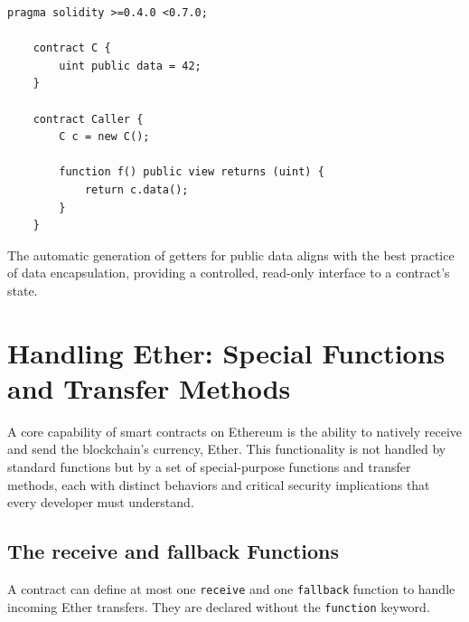 \documentclass{scrbook}
\begin{document}
\newpage

\begin{lstlisting}[caption={Automatic getter generation}, label={lbl:automatic_getter}]
    pragma solidity >=0.4.0 <0.7.0;
    
    contract C {
        uint public data = 42;
    }
    
    contract Caller {
        C c = new C();
        
        function f() public view returns (uint) {
            return c.data();
        }
    }
\end{lstlisting}

The automatic generation of getters for public data aligns with the best practice of data encapsulation, providing a controlled, read-only interface to a contract's state.

\chapter{Handling Ether: Special Functions and Transfer Methods}

A core capability of smart contracts on Ethereum is the ability to natively receive and send the blockchain's currency, Ether. This functionality is not handled by standard functions but by a set of special-purpose functions and transfer methods, each with distinct behaviors and critical security implications that every developer must understand.

\section{The receive and fallback Functions}

A contract can define at most one \texttt{receive} and one \texttt{fallback} function to handle incoming Ether transfers. They are declared without the \texttt{function} keyword.
\end{document}
